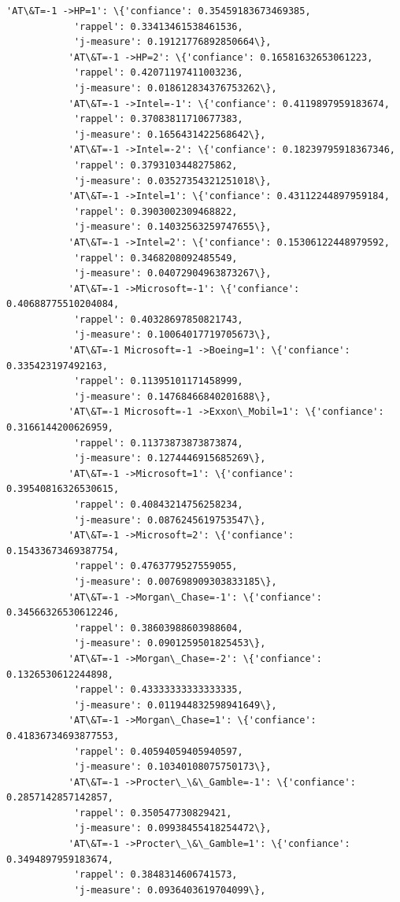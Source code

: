 \documentclass[11pt]{article}
\begin{document}
\begin{Verbatim}[commandchars=\\\{\}]
           'AT\&T=-1 ->HP=1': \{'confiance': 0.35459183673469385,
            'rappel': 0.33413461538461536,
            'j-measure': 0.19121776892850664\},
           'AT\&T=-1 ->HP=2': \{'confiance': 0.16581632653061223,
            'rappel': 0.42071197411003236,
            'j-measure': 0.018612834376753262\},
           'AT\&T=-1 ->Intel=-1': \{'confiance': 0.4119897959183674,
            'rappel': 0.37083811710677383,
            'j-measure': 0.1656431422568642\},
           'AT\&T=-1 ->Intel=-2': \{'confiance': 0.18239795918367346,
            'rappel': 0.3793103448275862,
            'j-measure': 0.03527354321251018\},
           'AT\&T=-1 ->Intel=1': \{'confiance': 0.43112244897959184,
            'rappel': 0.3903002309468822,
            'j-measure': 0.14032563259747655\},
           'AT\&T=-1 ->Intel=2': \{'confiance': 0.15306122448979592,
            'rappel': 0.3468208092485549,
            'j-measure': 0.04072904963873267\},
           'AT\&T=-1 ->Microsoft=-1': \{'confiance': 0.40688775510204084,
            'rappel': 0.40328697850821743,
            'j-measure': 0.10064017719705673\},
           'AT\&T=-1 Microsoft=-1 ->Boeing=1': \{'confiance': 0.335423197492163,
            'rappel': 0.11395101171458999,
            'j-measure': 0.14768466840201688\},
           'AT\&T=-1 Microsoft=-1 ->Exxon\_Mobil=1': \{'confiance': 0.3166144200626959,
            'rappel': 0.11373873873873874,
            'j-measure': 0.1274446915685269\},
           'AT\&T=-1 ->Microsoft=1': \{'confiance': 0.39540816326530615,
            'rappel': 0.40843214756258234,
            'j-measure': 0.0876245619753547\},
           'AT\&T=-1 ->Microsoft=2': \{'confiance': 0.15433673469387754,
            'rappel': 0.4763779527559055,
            'j-measure': 0.007698909303833185\},
           'AT\&T=-1 ->Morgan\_Chase=-1': \{'confiance': 0.34566326530612246,
            'rappel': 0.38603988603988604,
            'j-measure': 0.0901259501825453\},
           'AT\&T=-1 ->Morgan\_Chase=-2': \{'confiance': 0.1326530612244898,
            'rappel': 0.43333333333333335,
            'j-measure': 0.011944832598941649\},
           'AT\&T=-1 ->Morgan\_Chase=1': \{'confiance': 0.41836734693877553,
            'rappel': 0.40594059405940597,
            'j-measure': 0.10340108075750173\},
           'AT\&T=-1 ->Procter\_\&\_Gamble=-1': \{'confiance': 0.2857142857142857,
            'rappel': 0.350547730829421,
            'j-measure': 0.09938455418254472\},
           'AT\&T=-1 ->Procter\_\&\_Gamble=1': \{'confiance': 0.3494897959183674,
            'rappel': 0.3848314606741573,
            'j-measure': 0.0936403619704099\},

\end{Verbatim}
\end{document}
